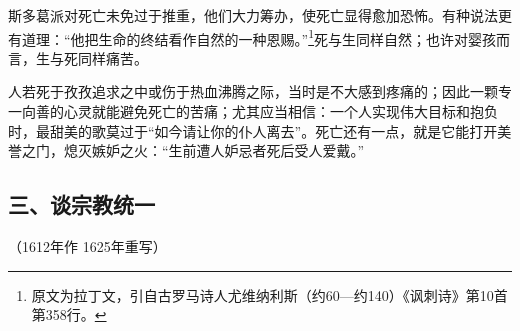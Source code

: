 \par 斯多葛派对死亡未免过于推重，他们大力筹办，使死亡显得愈加恐怖。有种说法更有道理：“他把生命的终结看作自然的一种恩赐。”\footnote{原文为拉丁文，引自古罗马诗人尤维纳利斯（约60—约140）《讽刺诗》第10首第358行。}死与生同样自然；也许对婴孩而言，生与死同样痛苦。
\par 人若死于孜孜追求之中或伤于热血沸腾之际，当时是不大感到疼痛的；因此一颗专一向善的心灵就能避免死亡的苦痛；尤其应当相信：一个人实现伟大目标和抱负时，最甜美的歌莫过于“如今请让你的仆人离去”。死亡还有一点，就是它能打开美誉之门，熄灭嫉妒之火：“生前遭人妒忌者死后受人爱戴。”



\subsection*{三、谈宗教统一}

\begin{center}
    （1612年作 1625年重写）
\end{center}

